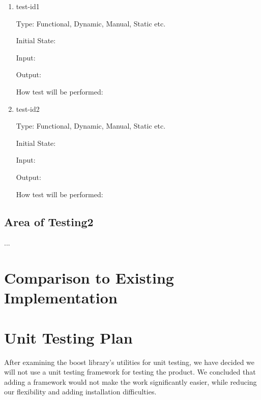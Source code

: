 \documentclass[12pt, titlepage]{article}
\begin{document}
		\begin{enumerate}

		\item{test-id1\\}

		Type: Functional, Dynamic, Manual, Static etc.
							
		Initial State: 
							
		Input: 
							
		Output: 
							
		How test will be performed: 
							
		\item{test-id2\\}

		Type: Functional, Dynamic, Manual, Static etc.
							
		Initial State: 
							
		Input: 
							
		Output: 
							
		How test will be performed: 

		\end{enumerate}

	\subsection{Area of Testing2}

	...

	
\section{Comparison to Existing Implementation}	
				
\section{Unit Testing Plan}
	
	After examining the boost library's utilities for unit testing, we have decided we will not use a unit testing framework for testing the product. We concluded that adding a framework would not make the work significantly easier, while reducing our flexibility and adding installation difficulties.
	
\end{document}
